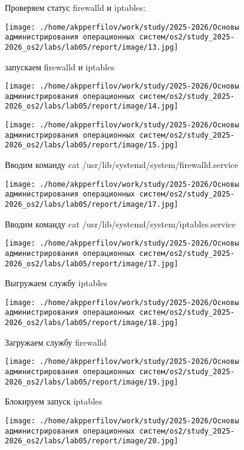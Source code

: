 \documentclass[
  english,
  russian,
  12pt,
  a4paper,
  DIV=11,
  numbers=noendperiod]{scrreprt}
\begin{document}
Проверяем статус firewalld и iptables:

\texttt{[image: ./home/akpperfilov/work/study/2025-2026/Основы администрирования операционных систем/os2/study\_2025-2026\_os2/labs/lab05/report/image/13.jpg]}

запускаем firewalld и iptables

\texttt{[image: ./home/akpperfilov/work/study/2025-2026/Основы администрирования операционных систем/os2/study\_2025-2026\_os2/labs/lab05/report/image/14.jpg]}

\texttt{[image: ./home/akpperfilov/work/study/2025-2026/Основы администрирования операционных систем/os2/study\_2025-2026\_os2/labs/lab05/report/image/15.jpg]}

Вводим команду cat /usr/lib/systemd/system/firewalld.service

\texttt{[image: ./home/akpperfilov/work/study/2025-2026/Основы администрирования операционных систем/os2/study\_2025-2026\_os2/labs/lab05/report/image/17.jpg]}

Вводим команду cat /usr/lib/systemd/system/iptables.service

\texttt{[image: ./home/akpperfilov/work/study/2025-2026/Основы администрирования операционных систем/os2/study\_2025-2026\_os2/labs/lab05/report/image/17.jpg]}

Выгружаем службу iptables

\texttt{[image: ./home/akpperfilov/work/study/2025-2026/Основы администрирования операционных систем/os2/study\_2025-2026\_os2/labs/lab05/report/image/18.jpg]}

Загружаем службу firewalld

\texttt{[image: ./home/akpperfilov/work/study/2025-2026/Основы администрирования операционных систем/os2/study\_2025-2026\_os2/labs/lab05/report/image/19.jpg]}

Блокируем запуск iptables

\texttt{[image: ./home/akpperfilov/work/study/2025-2026/Основы администрирования операционных систем/os2/study\_2025-2026\_os2/labs/lab05/report/image/20.jpg]}
\end{document}
